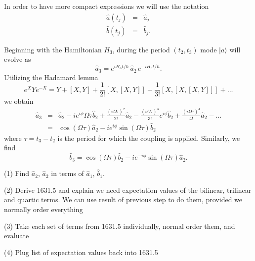 \documentclass[12pt]{iopart}
\begin{document}
In order to have more compact expressions we will use the notation
\begin{eqnarray}
\hat{a}(t_j) &=& \hat{a}_j \\
\hat{b}(t_j) &=& \hat{b}_j.
\end{eqnarray}

Beginning with the Hamiltonian $H_3$, during the period $(t_2, t_3)$ mode $|a\rangle$ will evolve as
\begin{equation}
\hat{a}_3 = e^{ i H_3 t/ \hbar} \, \hat{a}_2 \, e^{-i H_3 t/ \hbar}.
\end{equation}
Utilizing the Hadamard lemma
\begin{equation}
e^X Y e^{-X} = Y + [X,Y] + \frac{1}{2!}[X,[X,Y]] + \frac{1}{3!}[X,[X,[X,Y]]] + \ldots
\end{equation}
we obtain
\begin{eqnarray}
\hat{a}_3 &=& \hat{a}_2 - i e^{i\phi} \Omega \tau \hat{b}_2 + \frac{(i \Omega \tau)^2}{2!} \hat{a}_2 - \frac{(i \Omega \tau)^3}{3!}e^{i\phi} \hat{b}_2 + \frac{(i \Omega \tau)^4}{4!} \hat{a}_2 - \ldots \nonumber \\
          &=& \cos (\Omega \tau) \hat{a}_2 -i e^{i\phi} \sin (\Omega\tau) \hat{b}_2
\end{eqnarray}
where $\tau=t_3-t_2$ is the period for which the coupling is applied. Similarly, we find
\begin{equation}
\hat{b}_3 = \cos (\Omega \tau) \hat{b}_2 -i e^{-i\phi} \sin (\Omega\tau) \hat{a}_2.
\end{equation}

(1) Find $\hat{a}_2$, $\hat{a}_2$ in terms of $\hat{a}_1$, $\hat{b}_1$.

(2) Derive 1631.5 and explain we need expectation values of the bilinear, trilinear and quartic terms. We can use result of previous step to do them, provided we normally order everything

(3) Take each set of terms from 1631.5 individually, normal order them, and evaluate

(4) Plug list of expectation values back into 1631.5
\end{document}
